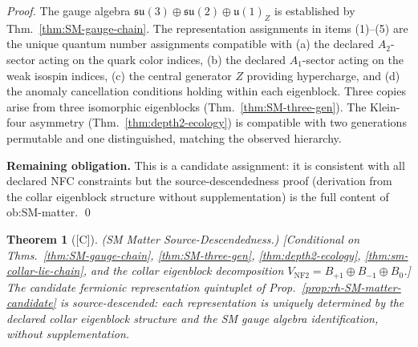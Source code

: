 \documentclass[12pt,oneside]{amsbook}
\theoremstyle{plain}
\newtheorem{theorem}{Theorem}[section]
\theoremstyle{definition}
\theoremstyle{remark}
\newcommand{\status}[1]{\textup{[#1]}}
\begin{document}
\begin{proof}
The gauge algebra $\mathfrak{su}(3)\oplus\mathfrak{su}(2)\oplus
\mathfrak{u}(1)_Z$ is established by Thm.~\ref{thm:SM-gauge-chain}.
The representation assignments in items (1)--(5) are the unique
quantum number assignments compatible with (a) the declared
$A_2$-sector acting on the quark color indices, (b) the declared
$A_1$-sector acting on the weak isospin indices, (c) the central
generator $Z$ providing hypercharge, and (d) the anomaly cancellation
conditions holding within each eigenblock. Three copies arise from
three isomorphic eigenblocks (Thm.~\ref{thm:SM-three-gen}). The
Klein-four asymmetry (Thm.~\ref{thm:depth2-ecology}) is compatible
with two generations permutable and one distinguished, matching the
observed hierarchy.

\textbf{Remaining obligation.} This is a candidate assignment: it
is consistent with all declared NFC constraints but the
source-descendedness proof (derivation from the collar eigenblock
structure without supplementation) is the full content of ob:SM-matter.
\qed
\end{proof}

\begin{theorem}[\status{C}]\label{thm:SM-matter-source-descended}
\textup{(SM Matter Source-Descendedness.)}
\textup{[Conditional on Thms.~\ref{thm:SM-gauge-chain},
\ref{thm:SM-three-gen}, \ref{thm:depth2-ecology},
\ref{thm:sm-collar-lie-chain}, and the collar eigenblock
decomposition $V_{\mathrm{NF2}} = B_{+1} \oplus B_{-1} \oplus B_0$.]}
The candidate fermionic representation quintuplet of
Prop.~\ref{prop:rh-SM-matter-candidate} is source-descended:
each representation is uniquely determined by the declared
collar eigenblock structure and the SM gauge algebra
identification, without supplementation.
\end{theorem}
\end{document}
